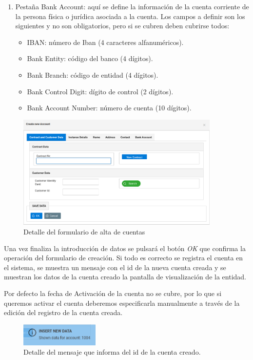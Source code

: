 \begin{description}
\begin{enumerate}
\item Pestaña Bank Account: aquí se define la información de la cuenta corriente de la persona física o jurídica asociada a la cuenta. Los campos a definir son los siguientes y no son obligatorios, pero si se cubren deben cubrirse todos:
	\begin{itemize}
	\item IBAN: número de Iban (4 caracteres alfanuméricos).
	\item Bank Entity: código del banco (4 dígitos).
	\item Bank Branch: código de entidad (4 dígitos).
	\item Bank Control Digit: dígito de control (2 dígitos).
	\item Bank Account Number: número de cuenta (10 dígitos).	
	\end{itemize}	
\end{enumerate}


\begin{figure}[H]
  \centering
  \includegraphics[width=0.9\textwidth]{imaxes/formulario-alta-cuenta.png}
  \caption{Detalle del formulario de alta de cuentas}
  \label{fig:formulario-alta-cuenta}
\end{figure}

Una vez finaliza la introducción de datos se pulsará el botón \emph{OK} que confirma la operación del formulario de creación. Si todo es correcto se registra el cuenta en el sistema, se muestra un mensaje con el id de la nueva cuenta creada y se muestran los datos de la cuenta creado la pantalla de visualización de la entidad.

Por defecto la fecha de Activación de la cuenta no se cubre, por lo que si queremos activar el cuenta deberemos especificarla manualmente a través de la edición del registro de la cuenta creada.


\begin{figure}[H]
  \centering
  \includegraphics[width=0.35\textwidth]{imaxes/mensaje-id-cuenta.png}
  \caption{Detalle del mensaje que informa del id de la cuenta creado.}
  \label{fig:mensaje-id-cuenta}
\end{figure}



\end{description}
